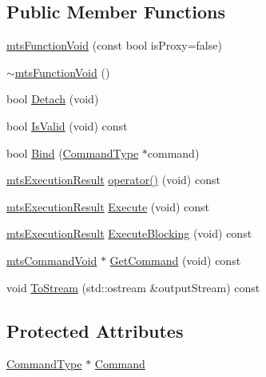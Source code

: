 \subsection*{Public Member Functions}
\begin{DoxyCompactItemize}
\item 
\hyperlink{classmts_function_void_ae83ab2874727476015fd013e8bc8fa3e}{mts\+Function\+Void} (const bool is\+Proxy=false)
\item 
\hyperlink{classmts_function_void_ae21d5d674eede40b132a5e34978e8137}{$\sim$mts\+Function\+Void} ()
\item 
bool \hyperlink{classmts_function_void_a1b129398698e60babfe28f4e82f778b1}{Detach} (void)
\item 
bool \hyperlink{classmts_function_void_a366d7b348e0fe6790067c6a5ab92f3f5}{Is\+Valid} (void) const 
\item 
bool \hyperlink{classmts_function_void_a03d9ae5c313a0464fac2fe99cd01be5f}{Bind} (\hyperlink{classmts_function_void_a76cc1c4742429e7cac7e4b73412f4cc9}{Command\+Type} $\ast$command)
\item 
\hyperlink{classmts_execution_result}{mts\+Execution\+Result} \hyperlink{classmts_function_void_aef53e6246e04936cd86021ff38ef13e3}{operator()} (void) const 
\item 
\hyperlink{classmts_execution_result}{mts\+Execution\+Result} \hyperlink{classmts_function_void_afdaa7e4b1247a986dc4bd54f1433cfd0}{Execute} (void) const 
\item 
\hyperlink{classmts_execution_result}{mts\+Execution\+Result} \hyperlink{classmts_function_void_a27c9f2b54e75a8b0ac1b9fc2b4acf766}{Execute\+Blocking} (void) const 
\item 
\hyperlink{classmts_command_void}{mts\+Command\+Void} $\ast$ \hyperlink{classmts_function_void_aee4d3326f9dd146aa565e0e3ce016068}{Get\+Command} (void) const 
\item 
void \hyperlink{classmts_function_void_a84d7f439003ba550206a265123d0fe16}{To\+Stream} (std\+::ostream \&output\+Stream) const 
\end{DoxyCompactItemize}
\subsection*{Protected Attributes}
\begin{DoxyCompactItemize}
\item 
\hyperlink{classmts_function_void_a76cc1c4742429e7cac7e4b73412f4cc9}{Command\+Type} $\ast$ \hyperlink{classmts_function_void_aa0384f1c3e204da6b625e520bbdef6c5}{Command}
\end{DoxyCompactItemize}
